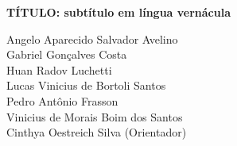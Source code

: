 \documentclass[
article,			%
11pt,				%
twoside,			%
a4paper,			%
section=TITLE,		%
onecolumn,          %
english,			%
brazil,				%
sumario=tradicional
]{abntex2}
\begin{document}
 
\begin{center}
   
    {\bfseries TÍTULO: subtítulo em língua vernácula} \\
   
    \vspace{0.5cm}

\end{center}



\begin{flushright}
    \fontsize{7}{9}\selectfont
    Angelo Aparecido Salvador Avelino\footnotemark[1] \quad   \\
    Gabriel Gonçalves Costa\footnotemark[2] \quad \\
    Huan Radov Luchetti\footnotemark[3] \quad  \\
    Lucas Vinicius de Bortoli Santos\footnotemark[4] \quad  \\
    Pedro Antônio Frasson\footnotemark[5] \quad  \\
    Vinicius de Morais Boim dos Santos\footnotemark[6] \quad  \\
    Cinthya Oestreich Silva (Orientador)\footnotemark[7] \\
\end{flushright}

\vspace{1cm}


\vspace{1cm}



    

\frenchspacing 
\end{document}
